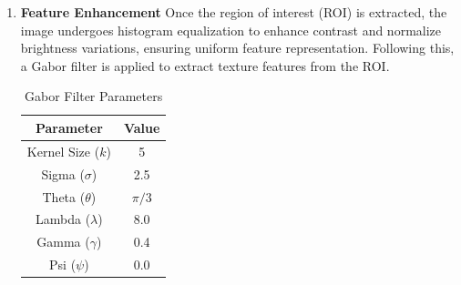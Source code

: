 \begin{enumerate}
    \item \textbf{Feature Enhancement}
    Once the region of interest (ROI) is extracted, the image undergoes histogram equalization to enhance contrast and normalize brightness variations, ensuring uniform feature representation. Following this, a Gabor filter is applied to extract texture features from the ROI.

    \begin{table}[h!]
        \centering
        \caption{Gabor Filter Parameters}
        \label{tab:gabor_params}
        \setlength{\tabcolsep}{4pt}
        \renewcommand{\arraystretch}{1.2}
        \begin{tabular}{|c|c|}
        \hline
        \textbf{Parameter} & \textbf{Value} \\ \hline
        Kernel Size ($k$)  & 5              \\ \hline
        Sigma ($\sigma$)   & 2.5            \\ \hline
        Theta ($\theta$)   & $\pi / 3$      \\ \hline
        Lambda ($\lambda$) & 8.0            \\ \hline
        Gamma ($\gamma$)   & 0.4            \\ \hline
        Psi ($\psi$)       & 0.0            \\ \hline
        \end{tabular}
    \end{table}
    

\end{enumerate}
